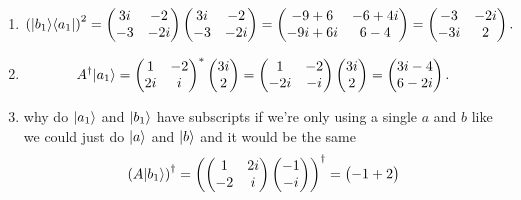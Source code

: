 \documentclass[11pt, letterpaper]{article}
\begin{document}
\begin{enumerate}
\[\begin{pmatrix}
			-3i-18 & 2+12i \\
			6i+9 & -4+6i
			\end{pmatrix}
		.\]
	\item
		\[
			\left( \lvert b_1\rangle \langle a_1\rvert  \right) ^2 = \begin{pmatrix}
			3i & -2 \\
			-3 & -2i
			\end{pmatrix}\begin{pmatrix}
			3i & -2 \\
			-3 & -2i
			\end{pmatrix}=\begin{pmatrix}
			-9+6 & -6+4i \\
			-9i+6i & 6-4
			\end{pmatrix}=\begin{pmatrix}
			-3 & -2i \\
			-3i & 2
			\end{pmatrix}
		.\]
	\item
		\[
			A^{\dagger} \lvert a_1\rangle =\begin{pmatrix}
			1 & -2 \\
			2i & i
		\end{pmatrix}^* \begin{pmatrix}
		3i \\
		2
		\end{pmatrix} = \begin{pmatrix}
		1 & -2 \\
		-2i & -i
	\end{pmatrix} \begin{pmatrix}
	3i \\
	2
	\end{pmatrix} = \begin{pmatrix}
	3i-4 \\
	6-2i
	\end{pmatrix}
		.\]
	\item why do $\lvert a_1\rangle $ and $\lvert b_1\rangle $ have subscripts if we're only using a single $a$ and $b$ like we could just do $\lvert a\rangle $ and $\lvert b\rangle $ and it would be the same
		\[
			\left( A \lvert b_1\rangle  \right) ^{\dagger} =\left( \begin{pmatrix}
			1 & 2i \\
			-2 & i
			\end{pmatrix}\begin{pmatrix}
			-1 \\
			-i
			\end{pmatrix} \right) ^{\dagger} =\begin{pmatrix}
			-1+2 \\

\end{pmatrix}\]
\end{enumerate}
\end{document}
